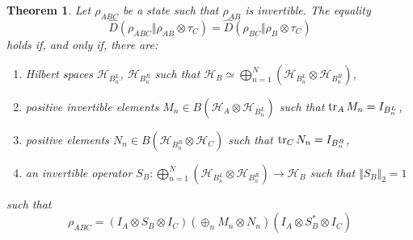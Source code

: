 \documentclass[11pt]{article}
\theoremstyle{newdefinition}
\theoremstyle{newplain}
\newtheorem{theorem}[definition]{Theorem}
\theoremstyle{myplain}
\DeclareMathOperator{\1}{\mathds{1}}
\begin{document}
{\begin{theorem}\label{theo:StructureBSDPI}
    Let $\rho_{ABC}$ be a state such that $\rho_{AB}$ is invertible. The equality
    \begin{equation}\label{eq:dpieq}
        \widehat{D}(\rho_{ABC}\Vert \rho_{AB}\otimes \tau_C)=\widehat{D}(\rho_{BC}\Vert \rho_B \otimes \tau_C)
    \end{equation}
    holds if, and only if, there are:
    \begin{enumerate}[label=(\roman*)]
        \item Hilbert spaces $\mathcal{H}_{B_n^L}$, $\mathcal{H}_{B_n^R}$ such that $\displaystyle \mathcal{H}_B \simeq \bigoplus_{n=1}^N\left( \mathcal{H}_{B_n^L} \otimes \mathcal{H}_{B_n^R}\right)$,\\
        \item \label{theo:Condition2} positive invertible elements $M_n \in B\left(\mathcal{H}_A \otimes \mathcal{H}_{B_n^L}\right)$ such that $\tr_A M_n=I_{B_n^L}$,\\
        \item \label{theo:Condition3} positive elements $N_n \in B\left( \mathcal{H}_{B_n^R}\otimes \mathcal{H}_C \right)$ such that $\tr_C N_n=I_{B_n^R}$,
        \item an invertible operator $S_B:\bigoplus_{n=1}^N \left( \mathcal{H}_{B_n^L} \otimes \mathcal{H}_{B_n^R}\right) \to \mathcal{H}_B$ such that $\Vert S_B \Vert_2=1$
\end{enumerate}
	such that
        \begin{equation}\label{AnnaStates}
            \rho_{ABC}=(I_A \otimes S_B \otimes I_C)(\oplus_n M_n \otimes N_n)(I_A\otimes S_B^*\otimes I_C)
        \end{equation}
\end{theorem}


}
\end{document}
